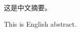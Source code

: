 \makectitlepage

\begin{cabstract}
这是中文摘要。
\end{cabstract}

\begin{eabstract}
This is English abstract.
\end{eabstract}

\frontmatter
{}

\tableofcontents

\mainmatter
